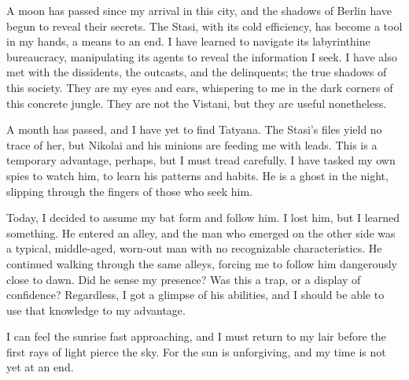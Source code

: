 
A moon has passed since my arrival in this city, and the shadows of Berlin have begun to reveal their secrets.
The Stasi, with its cold efficiency, has become a tool in my hands, a means to an end.
I have learned to navigate its labyrinthine bureaucracy, manipulating its agents to reveal the information I seek.
I have also met with the dissidents, the outcasts, and the delinquents; the true shadows of this society.
They are my eyes and ears, whispering to me in the dark corners of this concrete jungle.
They are not the Vistani, but they are useful nonetheless.

A month has passed, and I have yet to find Tatyana.
The Stasi's files yield no trace of her, but Nikolai and his minions are feeding me with leads.
This is a temporary advantage, perhaps, but I must tread carefully.
I have tasked my own spies to watch him, to learn his patterns and habits.
He is a ghost in the night, slipping through the fingers of those who seek him.

Today, I decided to assume my bat form and follow him.
I lost him, but I learned something.
He entered an alley, and the man who emerged on the other side was a typical, middle-aged, worn-out man with no recognizable characteristics.
He continued walking through the same alleys, forcing me to follow him dangerously close to dawn.
Did he sense my presence? Was this a trap, or a display of confidence? Regardless, I got a glimpse of his abilities, and I should be able to use that knowledge to my advantage.

I can feel the sunrise fast approaching, and I must return to my lair before the first rays of light pierce the sky.
For the sun is unforgiving, and my time is not yet at an end.

\vfill\newpage
